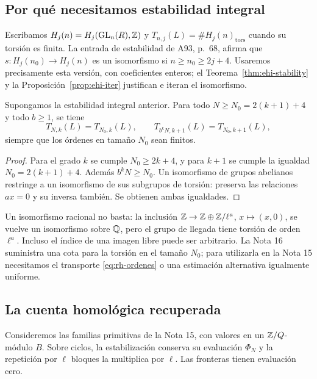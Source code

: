 \subsection{Por qué necesitamos estabilidad integral}

Escribamos $H_j(n)=H_j(\operatorname{GL}_n(R),\mathbb{Z})$ y $T_{n,j}(L)=\#H_j(n)_{\mathrm{tors}}$ cuando su torsión es finita. La entrada de estabilidad de A93, p.~68, afirma que $s:H_j(n_0)\to H_j(n)$ es un isomorfismo si $n\ge n_0\ge2j+4$. Usaremos precisamente esta versión, con coeficientes enteros; el Teorema~\ref{thm:ehi-stability} y la Proposición~\ref{prop:ehi-iter} justifican e iteran el isomorfismo.

\begin{proposicion}
\label{prop:rh-torsion-estable}
Supongamos la estabilidad integral anterior. Para todo $N\ge N_0=2(k+1)+4$ y todo $b\ge1$, se tiene
\begin{equation}
 T_{N,k}(L)=T_{N_0,k}(L),\qquad
 T_{b^kN,k+1}(L)=T_{N_0,k+1}(L),
 \label{eq:rh-ordenes}
\end{equation}
 siempre que los órdenes en tamaño $N_0$ sean finitos.
\end{proposicion}
\begin{proof}
Para el grado $k$ se cumple $N_0\ge2k+4$, y para $k+1$ se cumple la igualdad $N_0=2(k+1)+4$. Además $b^kN\ge N_0$. Un isomorfismo de grupos abelianos restringe a un isomorfismo de sus subgrupos de torsión: preserva las relaciones $ax=0$ y su inversa también. Se obtienen ambas igualdades.
\end{proof}

Un isomorfismo racional no basta: la inclusión $\mathbb{Z}\to\mathbb{Z}\oplus\mathbb{Z}/\ell^a$, $x\mapsto(x,0)$, se vuelve un isomorfismo sobre $\mathbb{Q}$, pero el grupo de llegada tiene torsión de orden $\ell^a$. Incluso el índice de una imagen libre puede ser arbitrario. La Nota 16 suministra una cota para la torsión en el tamaño $N_0$; para utilizarla en la Nota 15 necesitamos el transporte \eqref{eq:rh-ordenes} o una estimación alternativa igualmente uniforme.

\subsection{La cuenta homológica recuperada}

Consideremos las familias primitivas de la Nota 15, con valores en un $\mathbb{Z}/Q$-módulo $B$. Sobre ciclos, la estabilización conserva su evaluación $\Phi_N$ y la repetición por $\ell$ bloques la multiplica por $\ell$. Las fronteras tienen evaluación cero.

